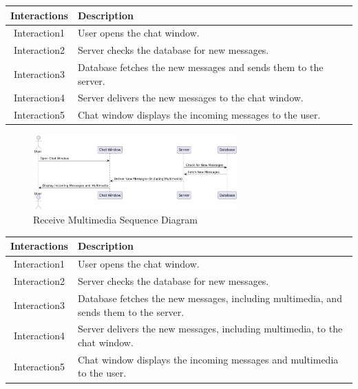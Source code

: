 \begin{longtable}{|c|p{10cm}|}
    \hline
    \textbf{Interactions} & \textbf{Description} \\
    \hline
    Interaction1 & User opens the chat window. \\
    \hline
    Interaction2 & Server checks the database for new messages. \\
    \hline
    Interaction3 & Database fetches the new messages and sends them to the server. \\
    \hline
    Interaction4 & Server delivers the new messages to the chat window. \\
    \hline
    Interaction5 & Chat window displays the incoming messages to the user. \\
    \hline
\end{longtable}
\newpage

\begin{figure}[h]
    \centering
    \includegraphics[width=0.7\textwidth]{images/recive_multimedia.png} %
    \caption{Receive Multimedia Sequence Diagram}
    \label{fig:example}
\end{figure}


\begin{longtable}{|c|p{10cm}|}
    \hline
    \textbf{Interactions} & \textbf{Description} \\
    \hline
    Interaction1 & User opens the chat window. \\
    \hline
    Interaction2 & Server checks the database for new messages. \\
    \hline
    Interaction3 & Database fetches the new messages, including multimedia, and sends them to the server. \\
    \hline
    Interaction4 & Server delivers the new messages, including multimedia, to the chat window. \\
    \hline
    Interaction5 & Chat window displays the incoming messages and multimedia to the user. \\
    \hline
\end{longtable}
\newpage

